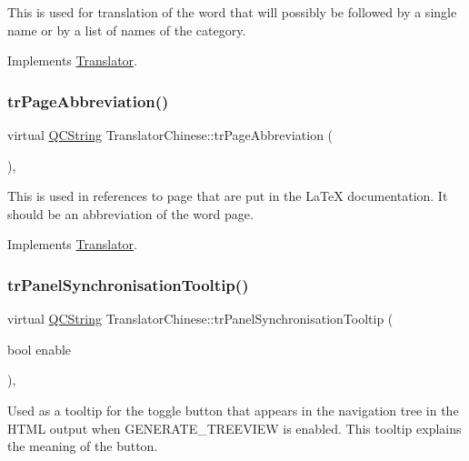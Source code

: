 This is used for translation of the word that will possibly be followed by a single name or by a list of names of the category. 

Implements \mbox{\hyperlink{class_translator}{Translator}}.

\mbox{\label{class_translator_chinese_aa7c088816c03d2721b443fe4959145fc}} 
\subsubsection{\texorpdfstring{trPageAbbreviation()}{trPageAbbreviation()}}
{\footnotesize\ttfamily virtual \mbox{\hyperlink{class_q_c_string}{Q\+C\+String}} Translator\+Chinese\+::tr\+Page\+Abbreviation (\begin{DoxyParamCaption}{ }\end{DoxyParamCaption})\hspace{0.3cm}{\ttfamily [inline]}, {\ttfamily [virtual]}}

This is used in references to page that are put in the La\+TeX documentation. It should be an abbreviation of the word page. 

Implements \mbox{\hyperlink{class_translator}{Translator}}.

\mbox{\label{class_translator_chinese_ac0e145118fc0ac65316ba3547e4ed37d}} 
\subsubsection{\texorpdfstring{trPanelSynchronisationTooltip()}{trPanelSynchronisationTooltip()}}
{\footnotesize\ttfamily virtual \mbox{\hyperlink{class_q_c_string}{Q\+C\+String}} Translator\+Chinese\+::tr\+Panel\+Synchronisation\+Tooltip (\begin{DoxyParamCaption}\item[{bool}]{enable }\end{DoxyParamCaption})\hspace{0.3cm}{\ttfamily [inline]}, {\ttfamily [virtual]}}

Used as a tooltip for the toggle button that appears in the navigation tree in the H\+T\+ML output when G\+E\+N\+E\+R\+A\+T\+E\+\_\+\+T\+R\+E\+E\+V\+I\+EW is enabled. This tooltip explains the meaning of the button. 

